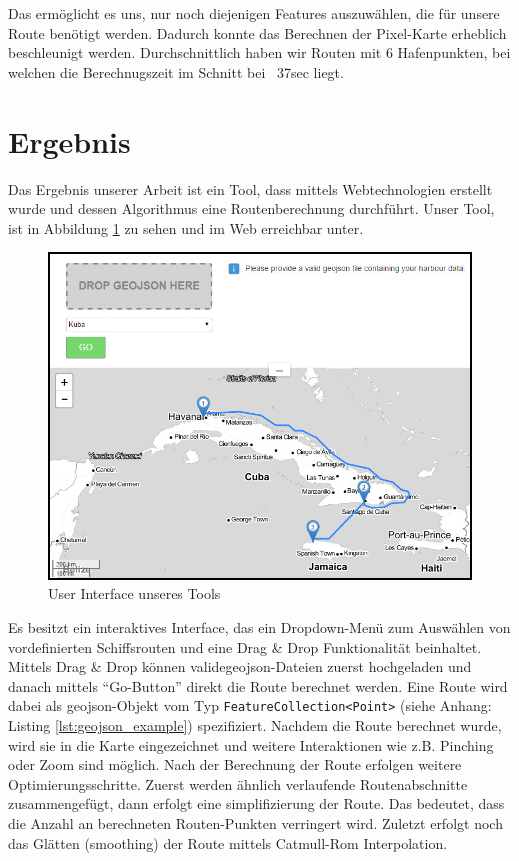 \documentclass[letterpaper]{article}
\begin{document}
	Das ermöglicht es uns, nur noch diejenigen Features auszuwählen, die für unsere Route benötigt werden. Dadurch konnte das Berechnen der Pixel-Karte erheblich beschleunigt werden. Durchschnittlich haben wir Routen mit 6 Hafenpunkten, bei welchen die Berechnugszeit im Schnitt bei ~37sec liegt.

\section{Ergebnis}
	Das Ergebnis unserer Arbeit ist ein Tool, dass mittels Webtechnologien erstellt wurde und dessen Algorithmus eine Routenberechnung durchführt.
	Unser Tool, ist in Abbildung \ref{fig:tool} zu sehen und im Web erreichbar unter\footnotemark.


	\begin{figure}[htbp]
		\centering
		\includegraphics[width=\linewidth]{tool}
		\caption{User Interface unseres Tools}
		\label{fig:tool}
	\end{figure}

	Es besitzt ein interaktives Interface, das ein Dropdown-Menü zum Auswählen von vordefinierten Schiffsrouten und eine Drag \& Drop Funktionalität beinhaltet. 
	Mittels Drag \& Drop können valide\footnotemark geojson-Dateien zuerst hochgeladen und danach mittels "`Go-Button"' direkt die Route berechnet werden. Eine Route wird dabei als geojson-Objekt vom Typ \texttt{FeatureCollection<Point>} (siehe Anhang: Listing \ref{lst:geojson_example}) spezifiziert.
	Nachdem die Route berechnet wurde, wird sie in die Karte eingezeichnet und weitere Interaktionen wie z.B. Pinching oder Zoom sind möglich. Nach der Berechnung der Route erfolgen weitere Optimierungsschritte. Zuerst werden ähnlich verlaufende Routenabschnitte zusammengefügt, dann erfolgt eine simplifizierung der Route. Das bedeutet, dass die Anzahl an berechneten Routen-Punkten verringert wird. Zuletzt erfolgt noch das Glätten (smoothing) der Route mittels Catmull-Rom Interpolation.
\end{document}
